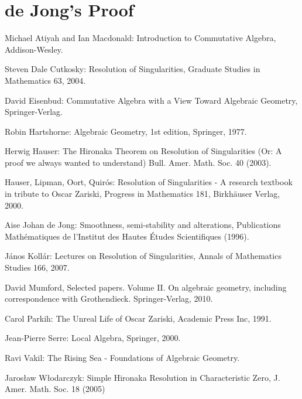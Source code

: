 \documentclass[12pt,a4paper,leqno]{article}
\theoremstyle{plain}
\theoremstyle{definition}
\theoremstyle{remark}
\begin{document}
\section{de Jong's Proof}\label{deJongRes}

\begin{thebibliography}{5, style=alpha}

Michael Atiyah and Ian Macdonald: Introduction to Commutative Algebra, Addison-Wesley.

Steven Dale Cutkosky: Resolution of Singularities, Graduate Studies in Mathematics 63, 2004.

David Eisenbud: Commutative Algebra with a View Toward Algebraic Geometry, Springer-Verlag.

Robin Hartshorne: Algebraic Geometry, 1st edition, Springer, 1977.

Herwig Hauser: The Hironaka Theorem on Resolution of Singularities (Or: A proof we always wanted to understand) Bull. Amer. Math. Soc. 40 (2003).

Hauser, Lipman, Oort, Quirós: Resolution of Singularities - A research textbook in tribute to Oscar Zariski, Progress in Mathematics 181, Birkhäuser Verlag, 2000.

Aise Johan de Jong: Smoothness, semi-stability and alterations, Publications Mathématiques de l’Institut des Hautes Études Scientifiques (1996).

János Kollár: Lectures on Resolution of Singularities, Annals of Mathematics Studies 166, 2007.

David Mumford, Selected papers. Volume II. On algebraic geometry, including correspondence with Grothendieck. Springer-Verlag, 2010.

 Carol Parkih: The Unreal Life of Oscar Zariski, Academic Press Inc, 1991.

Jean-Pierre Serre: Local Algebra, Springer, 2000.

Ravi Vakil: The Rising Sea - Foundations of Algebraic Geometry.

Jaros\l{}aw W\l{}odarczyk: Simple Hironaka Resolution in Characteristic Zero, J. Amer. Math. Soc. 18 (2005)
\end{thebibliography}
\end{document}
